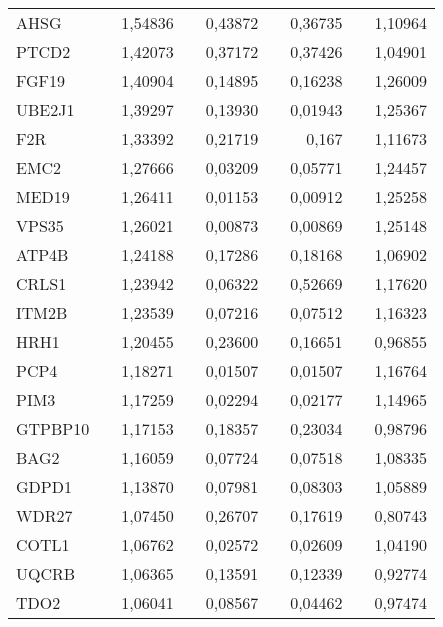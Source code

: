 \begin{center}
\begin{longtable}{lrrrrrrrr}
AHSG           & & 1,54836   & & 0,43872    & & 0,36735   & & 1,10964   \\
PTCD2          & & 1,42073   & & 0,37172    & & 0,37426   & & 1,04901   \\
FGF19          & & 1,40904   & & 0,14895    & & 0,16238   & & 1,26009   \\
UBE2J1         & & 1,39297   & & 0,13930    & & 0,01943   & & 1,25367   \\
F2R            & & 1,33392   & & 0,21719    & & 0,167     & & 1,11673   \\
EMC2           & & 1,27666   & & 0,03209    & & 0,05771   & & 1,24457   \\
MED19          & & 1,26411   & & 0,01153    & & 0,00912   & & 1,25258   \\
VPS35          & & 1,26021   & & 0,00873    & & 0,00869   & & 1,25148   \\
ATP4B          & & 1,24188   & & 0,17286    & & 0,18168   & & 1,06902   \\
CRLS1          & & 1,23942   & & 0,06322    & & 0,52669   & & 1,17620   \\
ITM2B          & & 1,23539   & & 0,07216    & & 0,07512   & & 1,16323   \\
HRH1           & & 1,20455   & & 0,23600    & & 0,16651   & & 0,96855   \\
PCP4           & & 1,18271   & & 0,01507    & & 0,01507   & & 1,16764   \\
PIM3           & & 1,17259   & & 0,02294    & & 0,02177   & & 1,14965   \\
GTPBP10        & & 1,17153   & & 0,18357    & & 0,23034   & & 0,98796   \\
BAG2           & & 1,16059   & & 0,07724    & & 0,07518   & & 1,08335   \\
GDPD1          & & 1,13870   & & 0,07981    & & 0,08303   & & 1,05889   \\
WDR27          & & 1,07450   & & 0,26707    & & 0,17619   & & 0,80743   \\
COTL1          & & 1,06762   & & 0,02572    & & 0,02609   & & 1,04190   \\
UQCRB          & & 1,06365   & & 0,13591    & & 0,12339   & & 0,92774   \\
TDO2           & & 1,06041   & & 0,08567    & & 0,04462   & & 0,97474   \\

\end{longtable}
\end{center}

